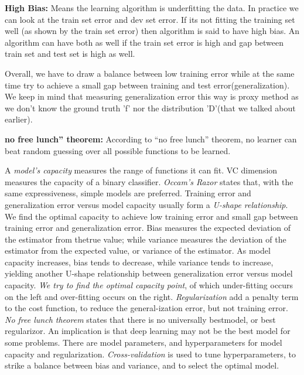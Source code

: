 \documentclass[openany]{book}
\begin{document}
\textbf{High Bias:}  Means the learning algorithm is underfitting the data. In practice we can look at the train set error and dev set error. If its not fitting the training set well (as shown by the train set error) then algorithm is said to have high bias. An algorithm can have both as well if the train set error is high and gap between train set and test set is high as well.

Overall, we have to draw a balance between low training error while at the same time try to achieve a small gap between training and test error(generalization). We keep in mind that measuring generalization error this way is proxy method as we don't know the ground truth 'f' nor the distribution 'D'(that we talked about earlier).

\textbf{no free lunch” theorem:}
According to “no free lunch” theorem, no learner can beat random guessing over all possible functions to be learned.

A \textit{model’s capacity} measures the range of functions it can fit. VC dimension measures the capacity of a binary classifier.  \textit{Occam’s Razor} states that, with the same expressiveness, simple models are preferred.  Training error and generalization error versus model capacity usually form a \textit{U-shape relationship}. We find the optimal capacity to achieve low training error and small gap between training error and generalization error.  Bias measures the expected deviation of the estimator from thetrue value; while variance measures the deviation of the estimator from the expected value, or variance of the estimator.  As model capacity increases, bias tends to decrease, while variance tends to increase, yielding another U-shape relationship between generalization error versus model capacity. \textit{We try to find the optimal capacity point}, of which under-fitting occurs on the left and over-fitting occurs on the right. \textit{ Regularization } add a penalty term to the cost function, to reduce the general-ization error, but not training error.  \textit{No free lunch theorem} states that there is no universally bestmodel, or best regularizor. An implication is that deep learning may not be the best model for some problems. There are model parameters, and hyperparameters for model capacity and regularization. \textit{Cross-validation} is used to tune hyperparameters, to strike a balance between bias and variance, and to select the optimal model. 
\end{document}
